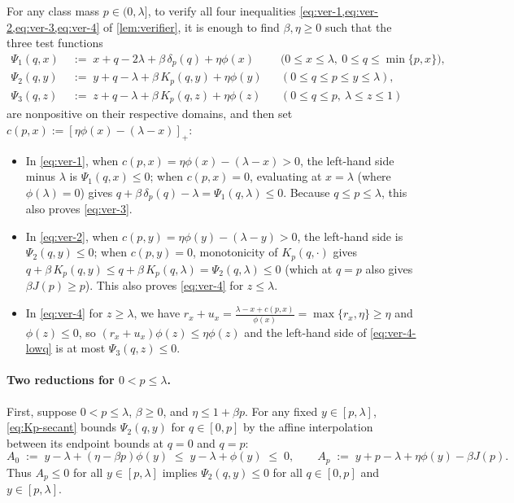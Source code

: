 \documentclass[11pt]{article}
\numberwithin{equation}{section}
\theoremstyle{plain}
\theoremstyle{definition}
\newcommand{\1}{\mathbf{1}}
\begin{document}
For any class mass $p \in (0, \lambda]$, to verify all four inequalities \cref{eq:ver-1,eq:ver-2,eq:ver-3,eq:ver-4} of \cref{lem:verifier}, it is enough to find $\beta, \eta \ge 0$ such that the three test functions
\begin{equation}
  \begin{aligned}
    \Psi_1(q, x) &\;:=\; x + q - 2\lambda + \beta\,\delta_p(q) + \eta\phi(x) && \bigl(0 \le x \le \lambda,\ 0 \le q \le \min\{p, x\}\bigr), \\
    \Psi_2(q, y) &\;:=\; y + q - \lambda + \beta\,K_p(q, y) + \eta\phi(y) && (0 \le q \le p \le y \le \lambda), \\
    \Psi_3(q, z) &\;:=\; z + q - \lambda + \beta\,K_p(q, z) + \eta\phi(z) && (0 \le q \le p,\ \lambda \le z \le 1)
  \end{aligned}
  \label{eq:L-R-H-test}
\end{equation}
are nonpositive on their respective domains, and then set $c(p, x) := [\eta\phi(x) - (\lambda - x)]_+$:
\begin{itemize}
  \item In \cref{eq:ver-1}, when $c(p, x) = \eta\phi(x) - (\lambda - x) > 0$, the left-hand side minus $\lambda$ is $\Psi_1(q, x) \le 0$; when $c(p, x) = 0$, evaluating at $x = \lambda$ (where $\phi(\lambda) = 0$) gives $q + \beta\,\delta_p(q) - \lambda = \Psi_1(q, \lambda) \le 0$. Because $q \le p \le \lambda$, this also proves \cref{eq:ver-3}.
  \item In \cref{eq:ver-2}, when $c(p, y) = \eta\phi(y) - (\lambda - y) > 0$, the left-hand side is $\Psi_2(q, y) \le 0$; when $c(p, y) = 0$, monotonicity of $K_p(q, \cdot)$ gives $q + \beta\,K_p(q, y) \le q + \beta\,K_p(q, \lambda) = \Psi_2(q, \lambda) \le 0$ (which at $q = p$ also gives $\beta J(p) \ge p$). This also proves \cref{eq:ver-4} for $z \le \lambda$.
  \item In \cref{eq:ver-4} for $z \ge \lambda$, we have $r_x + u_x = \frac{\lambda - x + c(p, x)}{\phi(x)} = \max\{r_x, \eta\} \ge \eta$ and $\phi(z) \le 0$, so $(r_x + u_x)\phi(z) \le \eta\phi(z)$ and the left-hand side of \cref{eq:ver-4-lowq} is at most $\Psi_3(q, z) \le 0$.
\end{itemize}

\paragraph{Two reductions for $0 < p \le \lambda$.}
First, suppose $0 < p \le \lambda$, $\beta \ge 0$, and $\eta \le 1 + \beta p$. For any fixed $y \in [p, \lambda]$, \cref{eq:Kp-secant} bounds $\Psi_2(q, y)$ for $q \in [0, p]$ by the affine interpolation between its endpoint bounds at $q = 0$ and $q = p$:
\[
  A_0 \;:=\; y - \lambda + (\eta - \beta p)\phi(y) \;\le\; y - \lambda + \phi(y) \;\le\; 0,
  \qquad
  A_p \;:=\; y + p - \lambda + \eta\phi(y) - \beta J(p).
\]
Thus $A_p \le 0$ for all $y \in [p, \lambda]$ implies $\Psi_2(q, y) \le 0$ for all $q \in [0, p]$ and $y \in [p, \lambda]$.
\end{document}

